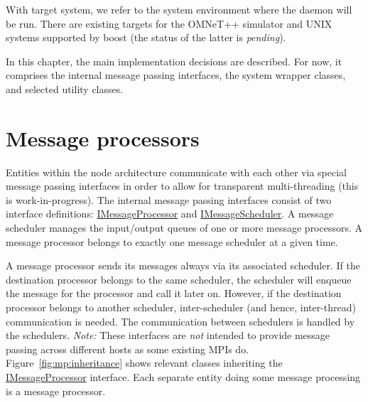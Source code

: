 With target system, we refer to the system environment where the daemon will be run. There are existing targets for the OMNeT++ simulator and UNIX systems supported by boost (the status of the latter is \emph{pending}).

In this chapter, the main implementation decisions are described. For now, it comprises the internal message passing interfaces, the system wrapper classes, and selected utility classes.


\section{Message processors}
\label{ch:classes:processors}

Entities within the node architecture communicate with each other via special message passing interfaces in order to allow for transparent multi-threading (this is work-in-progress).
The internal message passing interfaces consist of two interface definitions: \hyperlink{classIMessageProcessor}{IMessageProcessor} and \hyperlink{classIMessageScheduler}{IMessageScheduler}.
A message scheduler manages the input/output queues of one or more message processors. A message processor belongs to exactly one message scheduler at a given time.

A message processor sends its messages always via its associated scheduler. If the destination processor belongs to the same scheduler, the scheduler will enqueue the message for the processor and call it later on. However, if the destination processor belongs to another scheduler, inter-scheduler (and hence, inter-thread) communication is needed. The communication between schedulers is handled by the schedulers. \emph{Note:} These interfaces are \emph{not} intended to provide message passing across different hosts as some existing MPIs do. Figure~\ref{fig:mp:inheritance} shows relevant classes inheriting the \hyperlink{classIMessageProcessor}{IMessageProcessor} interface. Each separate entity doing some message processing is a message processor.

